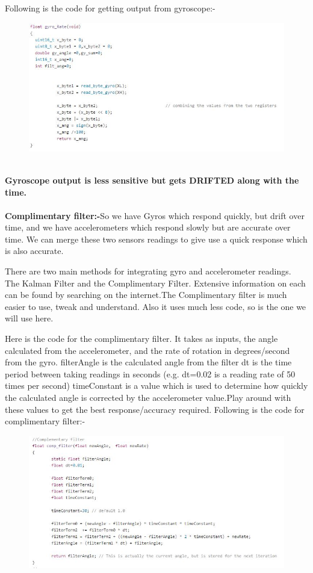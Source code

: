 \documentclass[12pt]{report}
\begin{document}
Following is the code for getting output from gyroscope:-
\begin{figure}
	\includegraphics{gyro.jpg}
\end{figure} \\
\textbf{Gyroscope output is less sensitive but gets DRIFTED along with the time.} \\ \\
\textbf{Complimentary filter:-}So we have Gyros which respond quickly, but drift over time, and we have accelerometers which respond slowly but are accurate over time. We can merge these two sensors readings to give use a quick response which is also accurate.

There are two main methods for integrating gyro and accelerometer readings. The Kalman Filter and the Complimentary Filter. Extensive information on each can be found by searching on the internet.The Complimentary filter is much easier to use, tweak and understand. Also it uses much less code, so is the one we will use here.

Here is the code for the complimentary filter. It takes as inputs, the angle calculated from the accelerometer, and the rate of rotation in degrees/second from the gyro.
filterAngle is the calculated angle from the filter
dt is the time period between taking readings in seconds (e.g. dt=0.02 is a reading rate of 50 times per second)
timeConstant is a value which is used to determine how quickly the calculated angle is corrected by the accelerometer value.Play around with these values to get the best response/accuracy required.
Following is the code for complimentary filter:-\\

\begin{figure}[h]
	\includegraphics[scale=0.7]{comp_filter.jpg}
\end{figure}
\end{document}

